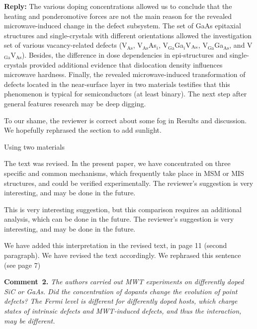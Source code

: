 \documentclass[10pt]{iopart}
\begin{document}
\noindent
\textcolor[rgb]{0.51,0.00,0.00}{\textbf{Reply:}}
The various doping concentrations allowed us to conclude 
that the heating and ponderomotive forces are not the main reason 
for the revealed microwave-induced change in the defect subsystem.
The set of GaAs epitaxial structures and single-crystals with different orientations 
allowed the investigation set of various vacancy-related defects
(V$_\mathrm{As}$, V$_\mathrm{As}$As$_i$, V$_\mathrm{Ga}$Ga$_i$V$_{\rm As}$,
V$_\mathrm{Ga}$Ga$_\mathrm{As}$, and V$_\mathrm{Ga}$V$_\mathrm{As}$).
Besides, the difference in dose dependencies in epi-structures and single-crystals
provided additional evidence that dislocation density influences microwave hardness.
Finally, the revealed microwave-induced transformation of 
defects located in the near-surface layer in two materials 
testifies that this phenomenon is typical for semiconductors (at least binary).
The next step after general features research may be deep digging.

To our shame, the reviewer is correct about some fog in Results and discussion. 
We hopefully rephrased the section to add sunlight.





Using two materials 



The text was revised.
In the present paper, we have concentrated on three specific and
common mechanisms, which frequently take place in MSM or MIS structures, and could be
verified experimentally. The reviewer’s suggestion is very interesting, and may be done in the
future.

This is very interesting suggestion, but this comparison requires an additional analysis,
which can be done in the future.
The reviewer’s suggestion is very interesting, and may be done in the
future.

We have added this interpretation in the revised text, in page 11 (second paragraph).
We have revised the text accordingly.
We rephrased this sentence (see page 7)

\vspace{1cm}
\noindent
\textcolor[rgb]{0.00,0.50,1.00}{\textbf{Comment~2.}}
\emph{The authors carried out MWT experiments on differently doped SiC or GaAs.
Did the concentration of dopants change the evolution of point defects?
The Fermi level is different for differently doped hosts,
which charge states of intrinsic defects and MWT-induced defects, and thus the interaction, may be different.}
\end{document}
